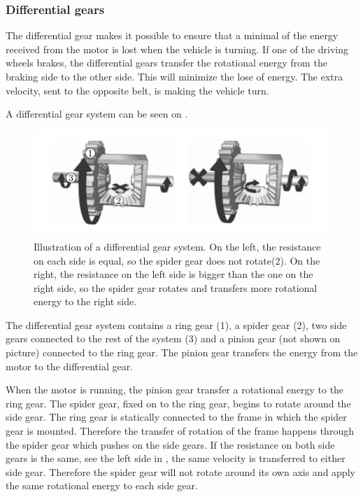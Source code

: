 \subsubsection{Differential gears} \label{sec:Differentialgears}
The differential gear makes it possible to ensure that a minimal of the energy received from the motor is lost when the vehicle is turning. If one of the driving wheels brakes, the differential gears transfer the rotational energy from the braking side to the other side. This will minimize the lose of energy. The extra velocity, sent to the opposite belt, is making the vehicle turn.

A differential gear system can be seen on .

\begin{figure}[H]
	\centering
	\includegraphics[scale=0.7]{figures/diffGearLightGray.pdf}
	\caption{Illustration of a differential gear system. On the left, the resistance on each side is equal, so the spider gear does not rotate(2). On the right, the resistance on the left side is bigger than the one on the right side, so the spider gear rotates and transfers more rotational energy to the right side. \cite{MechanicalEngineering}}
	\label{diffGearLight}
\end{figure}

The differential gear system contains a ring gear (1), a spider gear (2), two side gears connected to the rest of the system (3) and a pinion gear (not shown on picture) connected to the ring gear. The pinion gear transfers the energy from the motor to the differential gear.

When the motor is running, the pinion gear transfer a rotational energy to the ring gear. The spider gear, fixed on to the ring gear, begins to rotate around the side gear. The ring gear is statically connected to the frame in which the spider gear is mounted. Therefore the transfer of rotation of the frame happens through the spider gear which pushes on the side gears. If the resistance on both side gears is the same, see the left side in , the same velocity is transferred to either side gear. Therefore the spider gear will not rotate around its own axis and apply the same rotational energy to each side gear.

